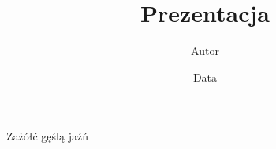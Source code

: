 \documentclass[]{beamer}
\title{Prezentacja}
\author{Autor}
\date{Data}
\begin{document}
\maketitle

\begin{frame}{Zażółć gęślą jaźń}
    
\end{frame}
\end{document}
